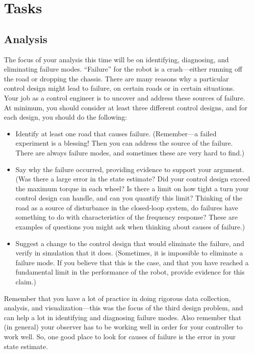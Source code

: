 \documentclass[conf]{new-aiaa}
\begin{document}
\section{Tasks}


\subsection{Analysis}
\label{secAnalysis}

The focus of your analysis this time will be on identifying, diagnosing, and eliminating failure modes. ``Failure'' for the robot is a crash---either running off the road or dropping the chassis. There are many reasons why a particular control design might lead to failure, on certain roads or in certain situations. Your job as a control engineer is to uncover and address these sources of failure. At minimum, you should consider at least three different control designs, and for each design, you should do the following:
\begin{itemize}
\item Identify at least one road that causes failure. (Remember---a failed experiment is a blessing! Then you can address the source of the failure. There are always failure modes, and sometimes these are very hard to find.)

\item Say why the failure occurred, providing evidence to support your argument. (Was there a large error in the state estimate? Did your control design exceed the maximum torque in each wheel? Is there a limit on how tight a turn your control design can handle, and can you quantify this limit? Thinking of the road as a source of disturbance in the closed-loop system, do failures have something to do with characteristics of the frequency response? These are examples of questions you might ask when thinking about causes of failure.)

\item Suggest a change to the control design that would eliminate the failure, and verify in simulation that it does. (Sometimes, it is impossible to eliminate a failure mode. If you believe that this is the case, and that you have reached a fundamental limit in the performance of the robot, provide evidence for this claim.)

\end{itemize}
Remember that you have a lot of practice in doing rigorous data collection, analysis, and visualization---this was the focus of the third design problem, and can help a lot in identifying and diagnosing failure modes. Also remember that (in general) your observer has to be working well in order for your controller to work well. So, one good place to look for causes of failure is the error in your state estimate.
\end{document}
